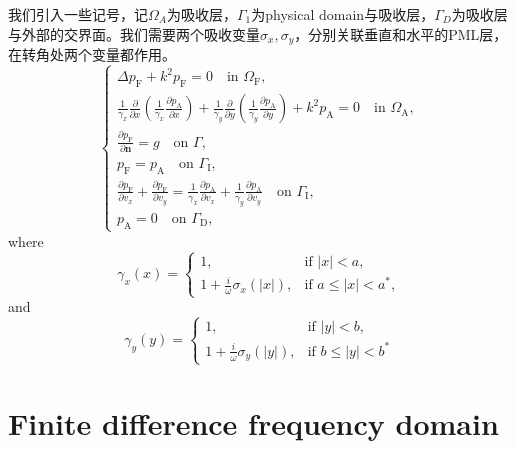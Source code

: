 \documentclass{article}
\begin{document}
\begin{CJK*}{UTF8}{gbsn}
我们引入一些记号，记$\Omega_A$为吸收层，$\Gamma_1$为physical
domain与吸收层，$\Gamma_D$为吸收层与外部的交界面。我们需要两个吸收变量$\sigma_x,
\sigma_y$，分别关联垂直和水平的PML层，在转角处两个变量都作用。
\[ \left\{ \begin{array}{l}
     \Delta p_{\mathrm{F}} + k^2 p_{\mathrm{F}} = 0 \quad \text{in }
     \Omega_{\mathrm{F}},\\
     \frac{1}{\gamma_x}  \frac{\partial}{\partial x}  \left(
     \frac{1}{\gamma_x}  \frac{\partial p_{\mathrm{A}}}{\partial x} \right) +
     \frac{1}{\gamma_y}  \frac{\partial}{\partial y}  \left(
     \frac{1}{\gamma_y}  \frac{\partial p_{\mathrm{A}}}{\partial y} \right) +
     k^2 p_{\mathrm{A}} = 0 \quad \text{in } \Omega_{\mathrm{A}},\\
     \frac{\partial p_{\mathrm{F}}}{\partial \mathbf{n}} = g \quad \text{on }
     \Gamma,\\
     p_{\mathrm{F}} = p_{\mathrm{A}}  \quad \text{on } \Gamma_{\mathrm{I}},\\
     \frac{\partial p_{\mathrm{F}}}{\partial v_x} + \frac{\partial
     p_{\mathrm{F}}}{\partial v_y} = \frac{1}{\gamma_x}  \frac{\partial
     p_{\mathrm{A}}}{\partial v_x} + \frac{1}{\gamma_y}  \frac{\partial
     p_{\mathrm{A}}}{\partial v_y}  \quad \text{on } \Gamma_{\mathrm{I}},\\
     p_{\mathrm{A}} = 0 \quad \text{on } \Gamma_{\mathrm{D}},
   \end{array} \right. \]
where
\[ \gamma_x (x) = \left\{ \begin{array}{ll}
     1, & \text{if } |x| < a,\\
     1 + \frac{i}{\omega} \sigma_x (|x|), & \text{if } a \leqslant |x| <
     a^{\ast},
   \end{array} \right. \]
and
\[ \gamma_y (y) = \left\{ \begin{array}{ll}
     1, & \text{if } |y| < b,\\
     1 + \frac{i}{\omega} \sigma_y (|y|), & \text{if } b \leqslant |y| <
     b^{\ast}
   \end{array} \right. \]

\section{Finite difference frequency domain}

\

\end{CJK*}
\end{document}
